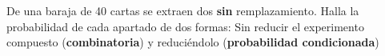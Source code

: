 \documentclass[addpoints,spanish, 12pt,a4paper]{exam}
\begin{document}
\begin{questions}
\question De una baraja de 40 cartas se extraen dos \textbf{sin} remplazamiento. Halla la probabilidad de cada apartado de dos formas: Sin reducir el experimento compuesto (\textbf{combinatoria}) y reduciéndolo (\textbf{probabilidad condicionada})

\begin{parts}

\end{parts}
\end{questions}
\end{document}
